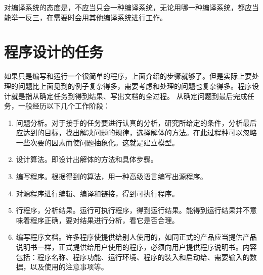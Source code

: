  对编译系统的态度是，不应当只会一种编译系统，无论用哪一种编译系统，都应当能举一反三，在需要时会用其他编译系统进行工作。

\section{程序设计的任务}

如果只是编写和运行一个很简单的程序，上面介绍的步骤就够了。但是实际上要处理的问题比上面见到的例子复杂得多，需要考虑和处理的问题也复杂得多。程序设计就是指从确定任务到得到结果、写出文档的全过程。
从确定问题到最后完成任务，一般经历以下几个工作阶段：
\begin{enumerate}
	\item 问题分析。对于接手的任务要进行认真的分析，研究所给定的条件，分析最后应达到的目标，找出解决问题的规律，选择解体的方法。在此过程种可以忽略一些次要的因素而使问题抽象化。这就是建立模型。
	\item 设计算法。即设计出解体的方法和具体步骤。
	\item 编写程序。根据得到的算法，用一种高级语言编写出源程序。
	\item 对源程序进行编辑、编译和链接，得到可执行程序。
	\item 行程序，分析结果。运行可执行程序，得到运行结果。能得到运行结果并不意味着程序正确，要对结果进行分析，看它是否合理。
	\item 编写程序文档。许多程序使提供给别人使用的，如同正式的产品应当提供产品说明书一样，正式提供给用户使用的程序，必须向用户提供程序说明书。内容包括：程序名称、程序功能、运行环境、程序的装入和启动给、需要输入的数据，以及使用的注意事项等。
\end{enumerate}
